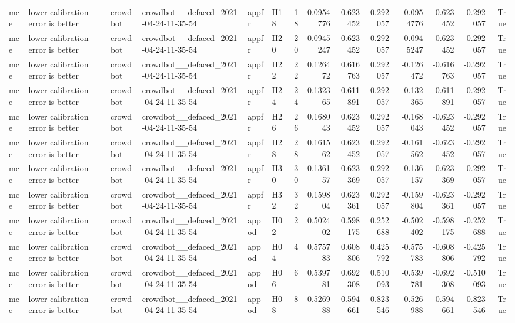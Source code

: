 \begin{longtable}{llllllrrrrrrrr}
mce & lower calibration error is better & crowdbot & crowdbot\_\_defaced\_2021-04-24-11-35-54 & appfr & H18 & 18 & 0.0954776 & 0.623452 & 0.292057 & -0.0954776 & -0.623452 & -0.292057 & True \\
mce & lower calibration error is better & crowdbot & crowdbot\_\_defaced\_2021-04-24-11-35-54 & appfr & H20 & 20 & 0.0945247 & 0.623452 & 0.292057 & -0.0945247 & -0.623452 & -0.292057 & True \\
mce & lower calibration error is better & crowdbot & crowdbot\_\_defaced\_2021-04-24-11-35-54 & appfr & H22 & 22 & 0.126472 & 0.616763 & 0.292057 & -0.126472 & -0.616763 & -0.292057 & True \\
mce & lower calibration error is better & crowdbot & crowdbot\_\_defaced\_2021-04-24-11-35-54 & appfr & H24 & 24 & 0.132365 & 0.611891 & 0.292057 & -0.132365 & -0.611891 & -0.292057 & True \\
mce & lower calibration error is better & crowdbot & crowdbot\_\_defaced\_2021-04-24-11-35-54 & appfr & H26 & 26 & 0.168043 & 0.623452 & 0.292057 & -0.168043 & -0.623452 & -0.292057 & True \\
mce & lower calibration error is better & crowdbot & crowdbot\_\_defaced\_2021-04-24-11-35-54 & appfr & H28 & 28 & 0.161562 & 0.623452 & 0.292057 & -0.161562 & -0.623452 & -0.292057 & True \\
mce & lower calibration error is better & crowdbot & crowdbot\_\_defaced\_2021-04-24-11-35-54 & appfr & H30 & 30 & 0.136157 & 0.623369 & 0.292057 & -0.136157 & -0.623369 & -0.292057 & True \\
mce & lower calibration error is better & crowdbot & crowdbot\_\_defaced\_2021-04-24-11-35-54 & appfr & H32 & 32 & 0.159804 & 0.623361 & 0.292057 & -0.159804 & -0.623361 & -0.292057 & True \\
mce & lower calibration error is better & crowdbot & crowdbot\_\_defaced\_2021-04-24-11-35-54 & appod & H02 & 2 & 0.502402 & 0.598175 & 0.252688 & -0.502402 & -0.598175 & -0.252688 & True \\
mce & lower calibration error is better & crowdbot & crowdbot\_\_defaced\_2021-04-24-11-35-54 & appod & H04 & 4 & 0.575783 & 0.608806 & 0.425792 & -0.575783 & -0.608806 & -0.425792 & True \\
mce & lower calibration error is better & crowdbot & crowdbot\_\_defaced\_2021-04-24-11-35-54 & appod & H06 & 6 & 0.539781 & 0.692308 & 0.510093 & -0.539781 & -0.692308 & -0.510093 & True \\
mce & lower calibration error is better & crowdbot & crowdbot\_\_defaced\_2021-04-24-11-35-54 & appod & H08 & 8 & 0.526988 & 0.594661 & 0.823546 & -0.526988 & -0.594661 & -0.823546 & True \\

\end{longtable}
